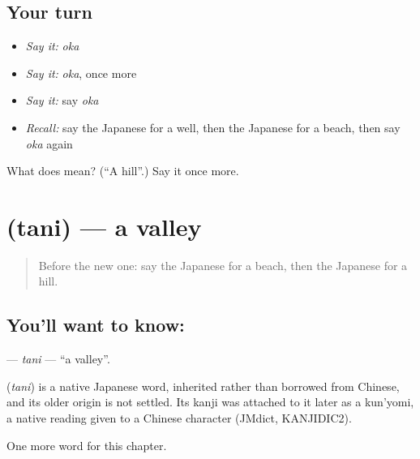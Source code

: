 \subsection*{Your turn}
\begin{itemize}
\raggedright
  \item \emph{Say it:} \emph{oka}
  \item \emph{Say it:} \emph{oka}, once more
  \item \emph{Say it:} say \emph{oka}
  \item \emph{Recall:} say the Japanese for a well, then the Japanese for a beach, then say \emph{oka} again
\end{itemize}

\begin{tcolorbox}[breakable,colback=teal!4,colframe=teal!35!black,title={Before you move on}]
What does  mean? (\textquotedblleft{}A hill\textquotedblright{}.) Say it once more.
\end{tcolorbox}
\section[\texorpdfstring{\ja{たに} (tani)}{たに (tani)}]{ (tani) — a valley}

\label{lesson:JA-C68-tani}



\begin{quote}
Before the new one: say the Japanese for a beach, then the Japanese for a hill.
\end{quote}

\subsection*{You'll want to know: }
\textbf{} — \emph{tani} — \textquotedblleft{}a valley\textquotedblright{}.

\begin{cousinweb}
\textbf{} (\emph{tani}) is a native Japanese word, inherited rather than borrowed from Chinese, and its older origin is not settled. Its kanji was attached to it later as a kun'yomi, a native reading given to a Chinese character (JMdict, KANJIDIC2).
\end{cousinweb}

\begin{grammarlens}[title={What you've built}]
One more word for this chapter.
\end{grammarlens}

